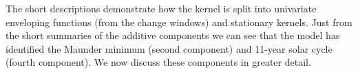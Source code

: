\documentclass{article}
\begin{document}
The short descriptions demonstrate how the kernel is split into univariate enveloping functions (from the change windows) and stationary kernels.
%
%
Just from the short summaries of the additive components we can see that the model has identified the Maunder minimum (second component) and 11-year solar cycle (fourth component).
We now discuss these components in greater detail.

%
%
%
%
\end{document}
